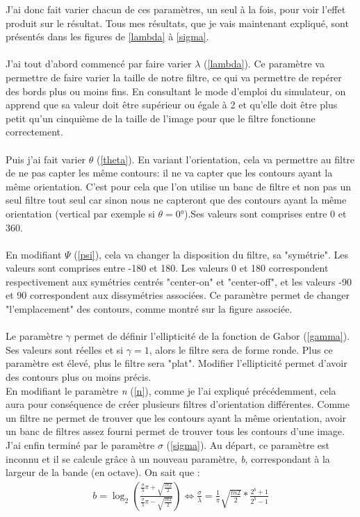 \documentclass[overfullbox, poster]{polytech/polytech}
\begin{document}
J'ai donc fait varier chacun de ces paramètres, un seul à la fois, pour voir l'effet produit sur le résultat. Tous mes résultats, que je vais maintenant expliqué, sont présentés dans les figures de \autoref{lambda} à \autoref{sigma}.\\
\\
J'ai tout d'abord commencé par faire varier $\lambda $ (\autoref{lambda}). Ce paramètre va permettre de faire varier la taille de notre filtre, ce qui va permettre de repérer des bords plus ou moins fins. En consultant le mode d'emploi du simulateur, on apprend que sa valeur doit être supérieur ou égale à 2 et qu'elle doit être plus petit qu'un cinquième de la taille de l'image pour que le filtre fonctionne correctement.\\
\\
Puis j'ai fait varier $\theta $ (\autoref{theta}). En variant l'orientation, cela va permettre au filtre de ne pas capter les même contours: il ne va capter que les contours ayant la même orientation. C'est pour cela que l'on utilise un banc de filtre et non pas un seul filtre tout seul car sinon nous ne capteront que des contours ayant la même orientation (vertical par exemple si $\theta = 0 $°).Ses valeurs sont comprises entre 0 et 360.\\
\\
En modifiant $\Psi $ (\autoref{psi}), cela va changer la disposition du filtre, sa "symétrie". Les valeurs sont comprises entre -180 et 180. Les valeurs 0 et 180 correspondent respectivement aux symétries centrés "center-on" et "center-off", et les valeurs -90 et 90 correspondent aux dissymétries associées. Ce paramètre permet de changer "l'emplacement" des contours, comme montré sur la figure associée.\\
\\
Le paramètre $\gamma $ permet de définir l'ellipticité de la fonction de Gabor (\autoref{gamma}). Ses valeurs sont réelles et si $\gamma = 1 $, alors le filtre sera de forme ronde. Plus ce paramètre est élevé, plus le filtre sera "plat". Modifier l'ellipticité permet d'avoir des contours plus ou moins précis.\\
En modifiant le paramètre \textit{n} (\autoref{n}), comme je l'ai expliqué précédemment, cela aura pour conséquence de créer plusieurs filtres d'orientation différentes. Comme un filtre ne permet de trouver que les contours ayant la même orientation, avoir un banc de filtres assez fourni permet de trouver tous les contours d'une image.\\
J'ai enfin terminé par le paramètre $\sigma $ (\autoref{sigma}). Au départ, ce paramètre est inconnu et il se calcule grâce à un nouveau paramètre, \textit{b}, correspondant à la largeur de la bande (en octave). On sait que :
\begin{align*}
b = \log _2 (\frac{\frac{\sigma}{\lambda} \pi + \sqrt{\frac{ln 2}{2}}}{\frac{\sigma}{\lambda} \pi - \sqrt{\frac{ln 2}{2}}})\Leftrightarrow \frac{\sigma}{\lambda} = \frac{1}{\pi } \sqrt{\frac{ln 2}{2}} * \frac{2^b + 1}{2^b - 1}
\end{align*}
\end{document}

